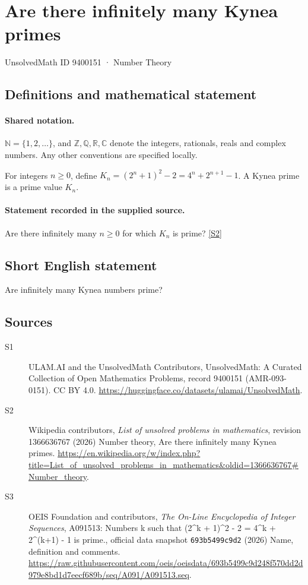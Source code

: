 \documentclass[11pt]{article}
\newcommand{\sref}[2]{\hyperlink{source:#1:#2}{[S#2]}}
\begin{document}
\setcounter{section}{9400150}
\section{Are there infinitely many Kynea primes}\label{9400151}
{\small\sffamily UnsolvedMath ID 9400151 · Number Theory}
\subsection{Definitions and mathematical statement}

\paragraph{Shared notation.}$\mathbb N=\{1,2,\ldots\}$, and $\mathbb Z,\mathbb Q,\mathbb R,\mathbb C$ denote the integers, rationals, reals and complex numbers. Any other conventions are specified locally.


For integers $n\ge0$, define $K_n=(2^n+1)^2-2=4^n+2^{n+1}-1$. A Kynea prime is a prime value $K_n$.
\paragraph{Statement recorded in the supplied source.}
Are there infinitely many $n\ge0$ for which $K_n$ is prime? \sref{9400151}{2}
\subsection{Short English statement}
Are infinitely many Kynea numbers prime?
\subsection{Sources}
\begin{description}
\item[\hypertarget{source:9400151:1}{S1}] ULAM.AI and the UnsolvedMath Contributors, UnsolvedMath: A Curated Collection of Open Mathematics Problems, record 9400151 (AMR-093-0151). CC BY 4.0. \url{https://huggingface.co/datasets/ulamai/UnsolvedMath}.
\item[\hypertarget{source:9400151:2}{S2}] Wikipedia contributors, \emph{List of unsolved problems in mathematics}, revision 1366636767 (2026) Number theory, Are there infinitely many Kynea primes. \url{https://en.wikipedia.org/w/index.php?title=List_of_unsolved_problems_in_mathematics&oldid=1366636767#Number_theory}.
\item[\hypertarget{source:9400151:3}{S3}] OEIS Foundation and contributors, \emph{The On-Line Encyclopedia of Integer Sequences}, A091513: Numbers k such that (2\textasciicircum{}k + 1)\textasciicircum{}2 - 2 = 4\textasciicircum{}k + 2\textasciicircum{}(k+1) - 1 is prime., official data snapshot \texttt{693b5499c9d2} (2026) Name, definition and comments. \url{https://raw.githubusercontent.com/oeis/oeisdata/693b5499c9d248f570dd2d979e8bd1d7eecf689b/seq/A091/A091513.seq}.
\end{description}
\label{end:9400151}
\end{document}
